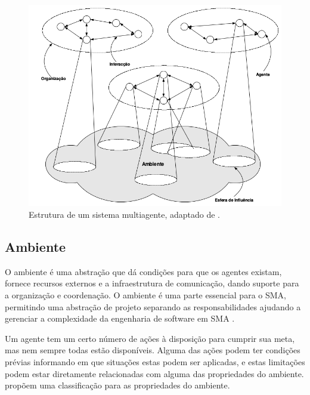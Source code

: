 \begin{figure}[ht]
\centering
\includegraphics[scale=0.4]{imagens/sma_org.png}
\caption{Estrutura de um sistema multiagente, adaptado de \cite{jennings2000agent}.}
\label{fig:sma_org}
\end{figure}

\subsection{Ambiente}

O ambiente é uma abstração que dá condições para que os agentes existam, fornece recursos externos e a infraestrutura de comunicação, dando suporte para a organização e coordenação. O ambiente é uma parte essencial para o SMA, permitindo uma abstração de projeto separando as responsabilidades ajudando a gerenciar a complexidade da engenharia de software em SMA \cite{weyns2007environment}.
  
Um agente tem um certo número de ações à disposição para cumprir sua meta, mas nem sempre todas estão disponíveis. Alguma das ações podem ter condições prévias informando em que situações estas podem ser aplicadas, e estas limitações podem estar diretamente relacionadas com alguma das propriedades do ambiente. \citet{russell2002artificial} propõem uma classificação para as propriedades do ambiente.
  
